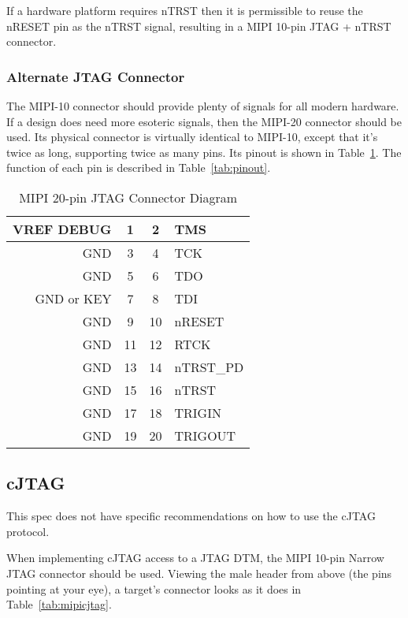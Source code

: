 If a hardware platform requires nTRST then it is permissible to reuse the nRESET pin as
the nTRST signal, resulting in a MIPI 10-pin JTAG + nTRST connector.

\subsubsection{Alternate JTAG Connector}

The MIPI-10 connector should provide plenty of signals for all modern hardware.
If a design does need more esoteric signals, then the
MIPI-20 connector should be used. Its physical connector is virtually identical
to MIPI-10, except that it's twice as long, supporting twice as many pins. Its
pinout is shown in Table~\ref{tab:mipitwenty}. The function of each pin
is described in Table~\ref{tab:pinout}.

\begin{table}[H]
    \centering
    \caption{MIPI 20-pin JTAG Connector Diagram}
    \label{tab:mipitwenty}
    \begin{tabular}{|r|c|c|l|}
        \hline
        VREF DEBUG & 1 & 2 & TMS \\
        \hline
        GND & 3 & 4 & TCK \\
        \hline
        GND & 5 & 6 & TDO \\
        \hline
        GND or KEY & 7 & 8 & TDI \\
        \hline
        GND & 9 & 10 & nRESET \\
        \hline
        GND & 11 & 12 & RTCK \\
        \hline
        GND & 13 & 14 & nTRST\_PD \\
        \hline
        GND & 15 & 16 & nTRST \\
        \hline
        GND & 17 & 18 & TRIGIN \\
        \hline
        GND & 19 & 20 & TRIGOUT \\
        \hline
    \end{tabular}
\end{table}

\subsection{cJTAG}

This spec does not have specific recommendations on how to use the cJTAG
protocol.

When implementing cJTAG access to a JTAG DTM, the MIPI 10-pin Narrow JTAG
connector should be used. Viewing the male header from above (the pins pointing
at your eye), a target's connector looks as it does in
Table~\ref{tab:mipicjtag}.

